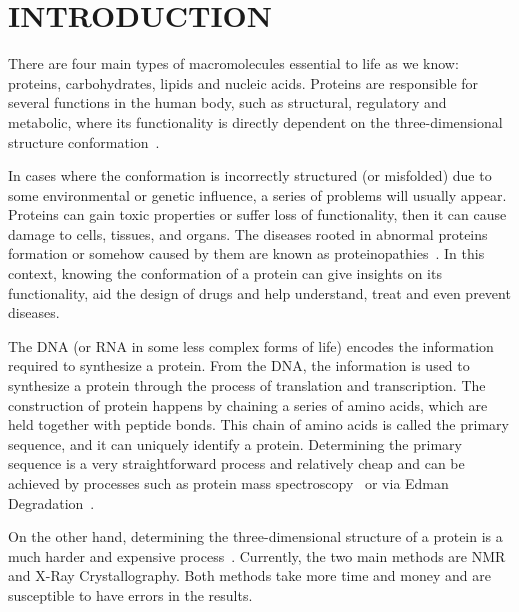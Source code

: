 \chapter{INTRODUCTION}\label{chap:introduction}

There are four main types of macromolecules essential to life as we know: proteins,
carbohydrates, lipids and nucleic acids. Proteins are responsible for several
functions in the human body, such as structural, regulatory and metabolic,
where its functionality is directly dependent on the three-dimensional
structure conformation~\cite{kihara2014protein}.

In cases where the conformation is incorrectly structured (or misfolded) due to
some environmental or genetic influence, a series of problems will usually appear.
Proteins can gain toxic properties or suffer loss of functionality,
then it can cause damage to cells,
tissues, and organs. The diseases rooted in abnormal proteins formation or somehow
caused by them are known as proteinopathies~\cite{shrestha2015yeast}.
In this context, knowing the conformation of a protein can give insights on its
functionality, aid the design of drugs and help understand, treat and even prevent diseases.

The \ac{DNA} (or \ac{RNA} in some less complex forms of life) encodes the information
required to synthesize a protein. From the \ac{DNA}, the information is used to
synthesize a protein through the process of translation and transcription. The
construction of protein happens by chaining a series of amino acids, which are
held together with peptide bonds. This chain of amino acids is called the primary
sequence, and it can uniquely identify a protein. Determining the primary
sequence is a very straightforward process and relatively cheap and can be
achieved by processes such as protein mass
spectroscopy~\cite{domon2006mass,covey1999protein}
or via Edman Degradation~\cite{edman1967protein}.

On the other hand, determining the three-dimensional structure of a protein is a
much harder and expensive process~\cite{guntert2004automated}.
Currently, the two main methods are
\acf{NMR} and X-Ray Crystallography. Both methods take more
time and money and are susceptible to have errors in the results.

